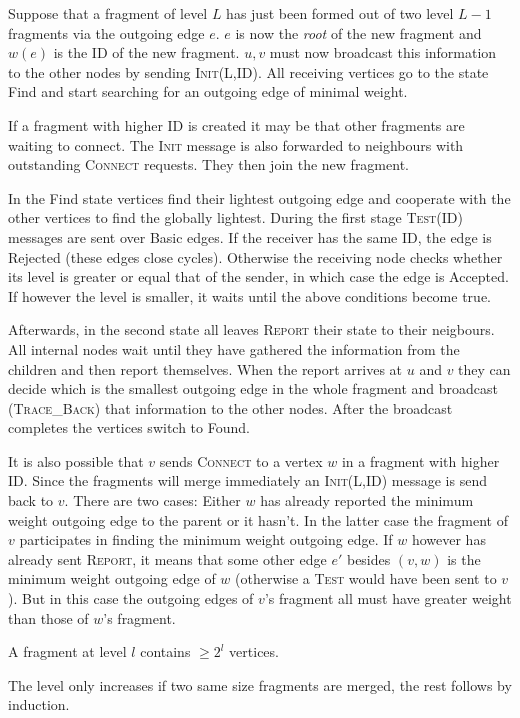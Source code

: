 Suppose that a fragment of level $L$ has just been formed out of two level $L-1$ fragments via the outgoing edge $e$. $e$ is now the \emph{root} of the new fragment and $w(e)$ is the ID of the new fragment. $u,v$ must now broadcast this information to the other nodes by sending {\scshape Init(L,ID)}. All receiving vertices go to the state Find and start searching for an outgoing edge of minimal weight.

If a fragment with higher ID is created it may be that other fragments are waiting to connect. The {\scshape Init} message is also forwarded to neighbours with outstanding {\scshape Connect} requests. They then join the new fragment.

In the Find state vertices find their lightest outgoing edge and cooperate with the other vertices to find the globally lightest. During the first stage {\scshape Test(ID)} messages are sent over Basic edges. If the receiver has the same ID, the edge is Rejected (these edges close cycles). Otherwise the receiving node checks whether its level is greater or equal that of the sender, in which case the edge is Accepted. If however the level is smaller, it waits until the above conditions become true.

Afterwards, in the second state all leaves {\scshape Report} their state to their neigbours. All internal nodes wait until they have gathered the information from the children and then report themselves. When the report arrives at $u$ and $v$ they can decide which is the smallest outgoing edge in the whole fragment and broadcast ({\scshape Trace\_Back}) that information to the other nodes. After the broadcast completes the vertices switch to Found.

It is also possible that $v$ sends {\scshape Connect} to a vertex $w$ in a fragment with higher ID. Since the fragments will merge immediately an {\scshape Init(L,ID)} message is send back to $v$. There are two cases: Either $w$ has already reported the minimum weight outgoing edge to the parent or it hasn't. In the latter case the fragment of $v$ participates in finding the minimum weight outgoing edge. If $w$ however has already sent {\scshape Report}, it means that some other edge $e'$ besides $(v,w)$ is the minimum weight outgoing edge of $w$ (otherwise a {\scshape Test} would have been sent to $v$). But in this case the outgoing edges of $v$'s fragment all must have greater weight than those of $w$'s fragment.

\begin{lem} A fragment at level $l$ contains $\geq 2^l$ vertices.\end{lem}
\begin{pr} The level only increases if two same size fragments are merged, the rest follows by induction.\end{pr}

